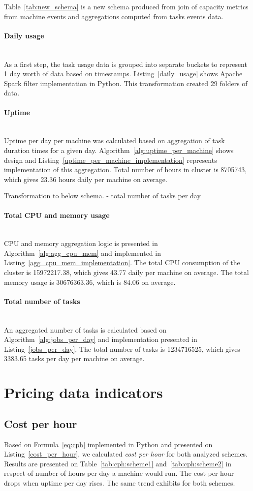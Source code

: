\documentclass[]{final_report}
\newcommand{\myparagraph}[1]{\paragraph{#1}\mbox{}\\}
\begin{document}
Table~\ref{tab:new_schema} is a new schema produced from join of capacity metrics from machine events and aggregations computed from tasks events data. 

\myparagraph{Daily usage}
As a first step, the task usage data is grouped into separate buckets to represent 1 day worth of data based on timestamps. Listing~\ref{daily_usage} shows Apache Spark filter implementation in Python. This transformation created 29 folders of data.

\myparagraph{Uptime}
Uptime per day per machine was calculated based on aggregation of task duration times for a given day. Algorithm~\ref{alg:uptime_per_machine} shows design and Listing~\ref{uptime_per_machine_implementation} represents implementation of this aggregation. Total number of hours in cluster is 8705743, which gives 23.36 hours daily per machine on average. 

Transformation to below schema. 
- total number of tasks per day

\myparagraph{Total CPU and memory usage}
CPU and memory aggregation logic is presented in Algorithm~\ref{alg:agg_cpu_mem} and implemented in Listing~\ref{agg_cpu_mem_implementation}. The total CPU consumption of the cluster is 15972217.38, which gives 43.77 daily per machine on average. The total memory usage is 30676363.36, which is 84.06 on average. 

\myparagraph{Total number of tasks}
An aggregated number of tasks is calculated based on Algorithm~\ref{alg:jobs_per_day} and implementation presented in Listing~\ref{jobs_per_day}. The total number of tasks is 1234716525, which gives 3383.65 tasks per day per machine on average.


\section{Pricing data indicators}

\subsection{Cost per hour}

Based on Formula~\ref{eq:cph} implemented in Python and presented on Listing~\ref{cost_per_hour}, we calculated \textit{cost per hour} for both analyzed schemes. Results are presented on Table~\ref{tab:cph:scheme1} and~\ref{tab:cph:scheme2} in respect of number of hours per day a machine would run. The cost per hour drops when uptime per day rises. The same trend exhibits for both schemes.
\end{document}
